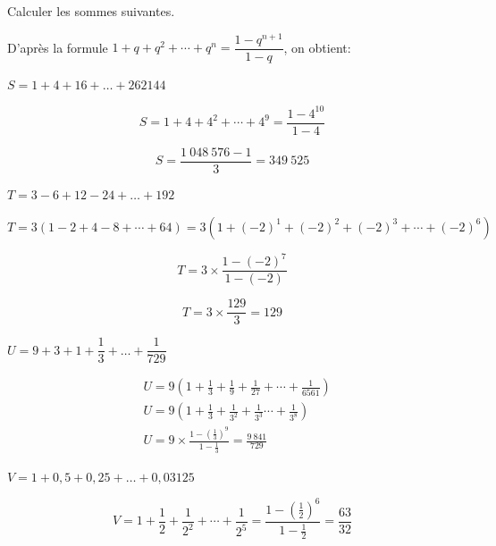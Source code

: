 \documentclass[11pt,a4paper]{article}  %
\begin{document}
Calculer les sommes suivantes.
\begin{corrBox}
	D'après la formule $1+q+q^2+\cdots+q^n=\dfrac{1-q^{n+1}}{1-q}$, on obtient:		
\end{corrBox}
	\begin{enumMet}
	\item $S=1+4+16+\ldots+262144$
	\begin{corrBox}
		$$S=1+4+4^2+\cdots+4^9=\frac{1-4^{10}}{1-4}$$
		
		$$
		S=\frac{1\ 048\ 576-1}{3}=349\ 525
		$$
		
			
	\end{corrBox}
	\item $T=3-6+12-24+\ldots+192$
	\begin{corrBox}
		$$T=3(1-2+4-8+\cdots+64)=3\left(1+(-2)^1+(-2)^2+(-2)^3+\cdots+(-2)^6\right)$$
		
		
		$$
		T=3 \times \frac{1-(-2)^7}{1-(-2)}
		$$
		
		
		$$
		T=3 \times \frac{129}{3}=129
		$$			
	\end{corrBox}
	\item $U=9+3+1+\dfrac{1}{3}+\ldots+\dfrac{1}{729}$
	\begin{corrBox}
		$$\begin{aligned}
			& U=9\left(1+\frac{1}{3}+\frac{1}{9}+\frac{1}{27}+\cdots+\frac{1}{6561}\right) \\
			& U=9\left(1+\frac{1}{3}+\frac{1}{3^2}+\frac{1}{3^3} \cdots+\frac{1}{3^8}\right) \\
			& U=9 \times \frac{1-\left(\frac{1}{3}\right)^9}{1-\frac{1}{3}}=\frac{9\ 841}{729}
		\end{aligned}$$		
	\end{corrBox}
	\item $V=1+0,5+0,25+\ldots+0,03125$
	\begin{corrBox}
		$$
		V=1+\frac{1}{2}+\frac{1}{2^2}+\cdots+\frac{1}{2^5}=\frac{1-\left(\frac{1}{2}\right)^6}{1-\frac{1}{2}}=\frac{63}{32}
		$$		
	\end{corrBox}
\end{enumMet}

\end{document}

